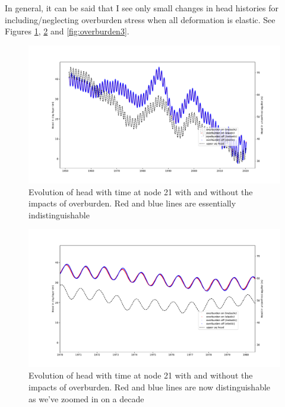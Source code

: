 \documentclass{article}
\begin{document}
In general, it can be said that I see only small changes in head histories for including/neglecting overburden stress when all deformation is elastic. See Figures \ref{fig:overburden1}, 
\ref{fig:overburden2} and \ref{fig:overburden3}. 

\begin{figure}
\includegraphics[width=\linewidth]{BasicIllustration.pdf}
\caption{Evolution of head with time at node 21 with and without the impacts of overburden. Red and blue lines are essentially indistinguishable}
\label{fig:overburden1}
\end{figure}

\begin{figure}
\includegraphics[width=\linewidth]{BasicIllustration_ZOOM.pdf}
\caption{Evolution of head with time at node 21 with and without the impacts of overburden. Red and blue lines are now distinguishable as we've zoomed in on a decade}
\label{fig:overburden2}
\end{figure}
\end{document}
